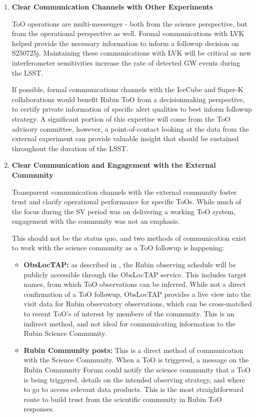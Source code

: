 \begin{enumerate}
\item \textbf{Clear Communication Channels with Other Experiments}

ToO operations are multi-messenger - both from the science perspective, but from the operational perspective as well. Formal communications with LVK helped provide the necessary information to inform a followup decision on S250725j. Maintaining these communications with LVK will be critical as new interferometer sensitivities increase the rate of detected GW events during the LSST.

If possible, formal communications channels with the IceCube and Super-K collaborations would benefit Rubin ToO from a decisionmaking perspective, to certify private information of specific alert qualities to best inform followup strategy. A significant portion of this expertise will come from the ToO advisory committee, however, a point-of-contact looking at the data from the external experiment can provide valuable insight that should be sustained throughout the duration of the LSST.

\item \textbf{Clear Communication and Engagement with the External Community}

Transparent communication channels with the external community foster trust and clarify operational performance for specific ToOs. While much of the focus during the SV period was on delivering a working ToO system, engagement with the community was not an emphasis.

This should not be the status quo, and two methods of communication exist to work with the science community as a ToO followup is happening:
\begin{itemize}
    \item \textbf{ObsLocTAP:} as described in , the Rubin observing schedule will be publicly accessible through the ObsLocTAP service. This includes target names, from which ToO observations can be inferred. While not a direct confirmation of a ToO followup, ObsLocTAP provides a live view into the visit data for Rubin observatory observations, which can be cross-matched to recent ToO's of interest by members of the community. This is an indirect method, and not ideal for communicating information to the Rubin Science Community.
    \item \textbf{Rubin Community posts:} This is a direct method of communication with the Science Community. When a ToO is triggered, a message on the Rubin Community Forum could notify the science community that a ToO is being triggered, details on the intended observing strategy, and where to go to access relevant data products. This is the most straightforward route to build trust from the scientific community in Rubin ToO responses.
\end{itemize}


\end{enumerate}
